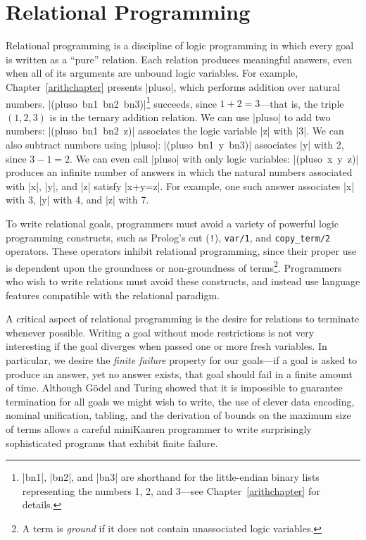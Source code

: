 

\section{Relational Programming}

Relational programming is a discipline of logic programming in which
every goal is written as a ``pure'' relation.  Each relation produces
meaningful answers, even when all of its arguments are unbound logic
variables.  For example, Chapter~\ref{arithchapter} presents
\scheme|pluso|, which performs addition over natural numbers.
\mbox{\scheme|(pluso bn1 bn2 bn3)|}\footnote{\scheme|bn1|, 
\scheme|bn2|, and \scheme|bn3| are shorthand for the little-endian binary 
lists representing the numbers 1, 2, and 3---see Chapter~\ref{arithchapter} for details.}
 succeeds, since $1+2=3$---that is,
the triple $(1,2,3)$ is in the ternary addition relation.  We can use
\scheme|pluso| to add two numbers: \mbox{\scheme|(pluso bn1 bn2 z)|}
associates the logic variable \scheme|z| with \scheme|3|.  We can also
subtract numbers using \scheme|pluso|: \mbox{\scheme|(pluso bn1 y bn3)|} 
associates \scheme|y| with 2, since $3-1=2$.  We can even
call \scheme|pluso| with only logic variables: \mbox{\scheme|(pluso x y z)|} 
produces an infinite number of answers in which the natural
numbers associated with \scheme|x|, \scheme|y|, and \scheme|z|
satisfy \scheme|x+y=z|.  For example, one such answer associates
\scheme|x| with 3, \scheme|y| with 4, and \scheme|z| with 7.

To write relational goals, programmers must avoid a variety of
powerful logic programming constructs, such as Prolog's
cut ({\tt !}), {\tt var/1}, and \mbox{{\tt copy\_term/2}} operators.  These
operators inhibit relational programming, since their proper use is
dependent upon the groundness or non-groundness of terms\footnote{A
  term is \emph{ground} if it does not contain unassociated logic
  variables.}.
Programmers who wish to write relations must avoid these
constructs, and instead use language features compatible with the
relational paradigm.

A critical aspect of relational programming is the desire for
relations to terminate whenever possible.  Writing a goal without mode
restrictions is not very interesting if the goal diverges when passed
one or more fresh variables.  In particular, we desire the
\emph{finite failure} property for our goals---if a goal is asked to
produce an answer, yet no answer exists, that goal should fail in a
finite amount of time.  Although G\"{o}del and Turing showed that it
is impossible to guarantee termination for all goals we might wish to
write, the use of clever data encoding, nominal unification, tabling,
and the derivation of bounds on the maximum size of terms allows a
careful miniKanren programmer to write surprisingly sophisticated
programs that exhibit finite failure.

